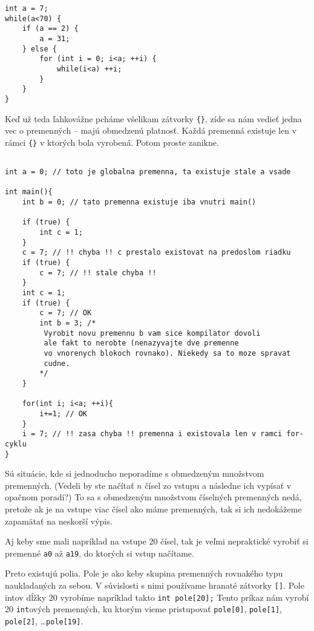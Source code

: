 \begin{lstlisting}
int a = 7;
while(a<70) {
    if (a == 2) {
        a = 31;
    } else {
        for (int i = 0; i<a; ++i) {
            while(i<a) ++i;
        }
    }
}
\end{lstlisting}

\medskip

Keď už teda ľahkovážne pcháme všelikam zátvorky \verb!{}!, zíde sa nám vedieť
jedna vec o premenných -- majú obmedzenú platnosť. Každá premenná existuje len
v rámci \verb!{}! v ktorých bola vyrobená.  Potom proste zanikne.

\begin{lstlisting}

int a = 0; // toto je globalna premenna, ta existuje stale a vsade

int main(){
    int b = 0; // tato premenna existuje iba vnutri main()

    if (true) {
        int c = 1;
    }
    c = 7; // !! chyba !! c prestalo existovat na predoslom riadku
    if (true) {
        c = 7; // !! stale chyba !!
    }
    int c = 1;
    if (true) {
        c = 7; // OK
        int b = 3; /*
         Vyrobit novu premennu b vam sice kompilator dovoli
         ale fakt to nerobte (nenazyvajte dve premenne
         vo vnorenych blokoch rovnako). Niekedy sa to moze spravat
         cudne.
        */
    }    

    for(int i; i<a; ++i){
        i+=1; // OK
    }
    i = 7; // !! zasa chyba !! premenna i existovala len v ramci for-cyklu
}
\end{lstlisting}




Sú situácie, kde si jednoducho neporadíme s obmedzeným množstvom premenných.
(Vedeli by ste načítať $n$ čísel zo vstupu a následne ich vypísať v opačnom
poradí?) To sa s obmedzeným množstvom číselných premenných nedá, pretože ak je
na vstupe viac čísel ako máme premenných, tak si ich nedokážeme zapamätať na
neskorší výpis. 

Aj keby sme mali napríklad na vstupe 20 čísel, tak je veľmi nepraktické vyrobiť
si premenné \verb!a0! až \verb!a19!, do ktorých si vstup načítame.

Preto existujú polia. Pole je ako keby skupina premenných rovnakého typu
naukladaných za sebou. V súvislosti s nimi používame hranaté zátvorky
\verb![]!. Pole intov dĺžky 20 vyrobíme napríklad takto \verb!int pole[20];!
Tento príkaz nám vyrobí 20 \verb!int!ových premenných, ku ktorým vieme pristupovať
\verb!pole[0]!, \verb!pole[1]!, \verb!pole[2]!, \dots \verb!pole[19]!.

